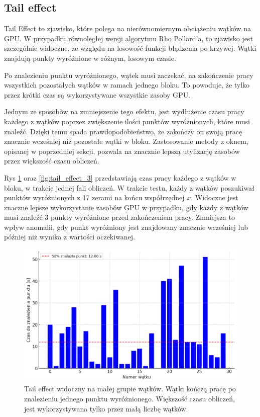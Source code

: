 \subsection{Tail effect}
Tail Effect to zjawisko, które polega na nierównomiernym obciążeniu wątków na GPU.
W przypadku równoległej wersji algorytmu Rho Pollard'a, to zjawisko jest szczególnie widoczne,
ze względu na losowość funkcji błądzenia po krzywej.
Wątki znajdują punkty wyróżnione w różnym, losowym czasie.
\par
Po znalezieniu punktu wyróżnionego, wątek musi zaczekać, na zakończenie pracy wszystkich
pozostałych wątków w ramach jednego bloku.
To powoduje, że tylko przez krótki czas są wykorzystywane wszystkie zasoby GPU.
\par
Jednym ze sposobów na zmniejszenie tego efektu, jest wydłużenie czasu pracy każdego z wątków poprzez zwiększenie ilości punktów wyróżnionych,
które musi znaleźć. Dzięki temu spada prawdopodobieństwo, że zakończy on swoją pracę znacznie wcześniej niż pozostałe wątki w bloku.
Zastosowanie metody z oknem, opisanej w poprzedniej sekcji, pozwala na znacznie lepszą utylizację zasobów przez większość
czasu obliczeń.
\par
Rys \ref{fig:tail_effect_1} oraz \ref{fig:tail_effect_3} przedstawiają czas pracy każdego z wątków w bloku, w trakcie jednej fali obliczeń.
W trakcie testu, każdy z wątków poszukiwał punktów wyróżnionych z 17 zerami na końcu współrzędnej $x$. Widoczne jest
znaczne lepsze wykorzystanie zasobów GPU w przypadku, gdy każdy z wątków musi znaleźć 3 punkty wyróżnione przed zakończeniem pracy.
Zmniejsza to wpływ anomalii, gdy punkt wyróżniony jest znajdowany znacznie wcześniej lub później niż wynika z wartości oczekiwanej.

\begin{figure}[H]
    \centering
    \includegraphics[width=1\textwidth]{img/tailing_effect_single_17.png}
    \caption{Tail effect widoczny na małej grupie wątków. Wątki kończą pracę po znalezieniu jednego punktu wyróżnionego.
        Większość czasu obliczeń, jest wykorzystywana tylko przez małą liczbę wątków.}
    \label{fig:tail_effect_1}
\end{figure}

